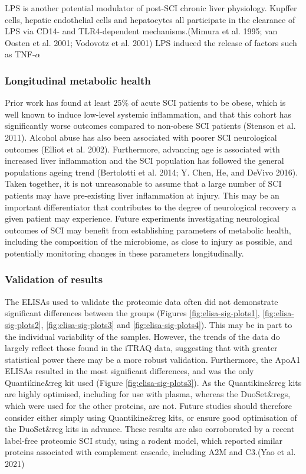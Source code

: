 \documentclass[9pt,lineno]{elife}
\begin{document}
LPS is another potential modulator of post-SCI chronic liver physiology.
Kupffer cells, hepatic endothelial cells and hepatocytes all participate in the clearance of LPS via CD14- and TLR4-dependent mechanisms.(Mimura et al. 1995; van Oosten et al. 2001; Vodovotz et al. 2001)
LPS induced the release of factors such as TNF-\(\alpha\)

\hypertarget{longitudinal-metabolic-health}{%
\subsubsection{Longitudinal metabolic health}\label{longitudinal-metabolic-health}}

Prior work has found at least 25\% of acute SCI patients to be obese, which is well known to induce low-level systemic inflammation, and that this cohort has significantly worse outcomes compared to non-obese SCI patients (Stenson et al. 2011).
Alcohol abuse has also been associated with poorer SCI neurological outcomes (Elliot et al. 2002).
Furthermore, advancing age is associated with increased liver inflammation and the SCI population has followed the general populations ageing trend (Bertolotti et al. 2014; Y. Chen, He, and DeVivo 2016).
Taken together, it is not unreasonable to assume that a large number of SCI patients may have pre-existing liver inflammation at injury.
This may be an important differentiator that contributes to the degree of neurological recovery a given patient may experience.
Future experiments investigating neurological outcomes of SCI may benefit from establishing parameters of metabolic health, including the composition of the microbiome, as close to injury as possible, and potentially monitoring changes in these parameters longitudinally.

\hypertarget{validation-of-results}{%
\subsubsection{Validation of results}\label{validation-of-results}}

The ELISAs used to validate the proteomic data often did not demonstrate significant differences between the groups (Figures \ref{fig:elisa-sig-plots1}, \ref{fig:elisa-sig-plots2}, \ref{fig:elisa-sig-plots3} and \ref{fig:elisa-sig-plots4}).
This may be in part to the individual variability of the samples.
However, the trends of the data do largely reflect those found in the iTRAQ data, suggesting that with greater statistical power there may be a more robust validation.
Furthermore, the ApoA1 ELISAs resulted in the most significant differences, and was the only Quantikine\&reg kit used (Figure \ref{fig:elisa-sig-plots3}).
As the Quantikine\&reg kits are highly optimised, including for use with plasma, whereas the DuoSet\&regs, which were used for the other proteins, are not.
Future studies should therefore consider either simply using Quantikine\&reg kits, or ensure good optimisation of the DuoSet\&reg kits in advance.
These results are also corroborated by a recent label-free proteomic SCI study, using a rodent model, which reported similar proteins associated with complement cascade, including A2M and C3.(Yao et al. 2021)
\end{document}
